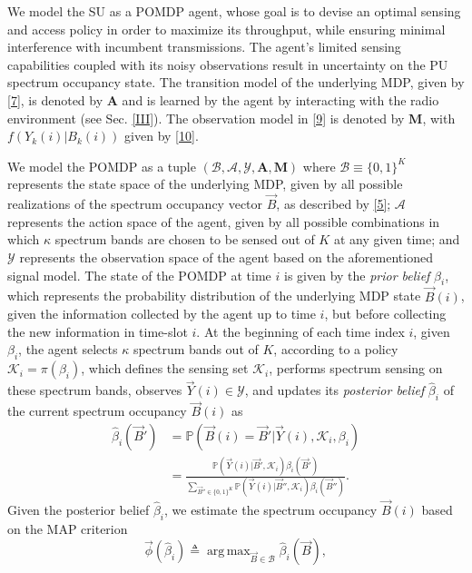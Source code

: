 \documentclass[10pt,twocolumn]{IEEEtran}
\DeclareMathOperator*{\argmax}{arg\,max}
\begin{document}
We model the SU as a POMDP agent, whose goal is to devise an optimal sensing and access policy in order to maximize its throughput, while ensuring minimal interference with incumbent transmissions. The agent's limited sensing capabilities coupled with its noisy observations result in uncertainty on the PU spectrum occupancy state. The transition model of the underlying MDP, given by \eqref{7}, is denoted by $\mathbf{A}$ and is learned by the agent by interacting with the radio environment (see Sec. \ref{III}). The observation model in \eqref{9} is denoted by $\mathbf{M}$, with $f(Y_k(i)|B_k(i))$ given by \eqref{10}. 

We model the POMDP as a tuple $(\mathcal{B},\mathcal{A},\mathcal{Y},\mathbf{A},\mathbf{M})$ where $\mathcal{B}{\equiv}\{0,1\}^K$ represents the state space of the underlying MDP, given by all possible realizations of the spectrum occupancy vector $\vec{B}$, as described by \eqref{5}; $\mathcal{A}$ represents the action space of the agent, given by all possible combinations in which $\kappa$ spectrum bands are chosen to be sensed out of $K$ at any given time; and $\mathcal{Y}$ represents the observation space of the agent based on the aforementioned signal model. The state of the POMDP at time $i$ is given by the \emph{prior belief} $\beta_i$, which represents the probability distribution of the underlying MDP state $\vec{B}(i)$, given the information collected by the agent up to time $i$, but before collecting the new information in time-slot $i$. At the beginning of each time index $i$, given $\beta_i$, the agent selects $\kappa$ spectrum bands out of $K$, according to a policy $\mathcal K_i{=}\pi(\beta_i)$, which defines the sensing set $\mathcal K_i$, performs spectrum sensing  on these spectrum bands, observes $\vec{Y}(i){\in} \mathcal{Y}$, and updates its \emph{posterior belief} $\hat{\beta}_i$ of the current spectrum occupancy $\vec{B}(i)$ as 
\begin{align}\label{11}
\nonumber
    \hat\beta_i(\vec{B}') &= \mathbb{P}(\vec{B}(i) = \vec{B}'|\vec{Y}(i), \mathcal K_i, \beta_i)\\&=
    \frac{\mathbb{P}(\vec{Y}(i)|\vec{B}', \mathcal{K}_i) \beta_i(\vec{B}')}{
    \sum_{\vec{B}'' {\in} \{0,1\}^K} \mathbb{P}(\vec{Y}(i)|\vec{B}'', \mathcal{K}_i) \beta_i(\vec{B}'')}.
\end{align}
Given the posterior belief $\hat{\beta}_i$, we estimate the spectrum occupancy $\vec{B}(i)$
based on the MAP criterion
$$
\vec{\phi}(\hat{\beta}_{i})\triangleq \argmax_{\vec{B} {\in} \mathcal{B}} \hat{\beta}_{i}(\vec{B}),
$$
\end{document}
